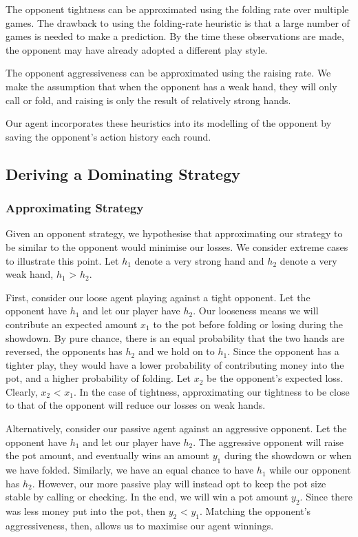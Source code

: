 \documentclass{article}
\begin{document}
The opponent tightness can be approximated using the folding rate over multiple games. The drawback to using the folding-rate heuristic is that a large number of games is needed to make a prediction. By the time these observations are made, the opponent may have already adopted a different play style.

The opponent aggressiveness can be approximated using the raising rate. We make the assumption that when the opponent has a weak hand, they will only call or fold, and raising is only the result of relatively strong hands.

Our agent incorporates these heuristics into its modelling of the opponent by saving the opponent's action history each round.

\subsection{Deriving a Dominating Strategy}

\subsubsection{Approximating Strategy}
Given an opponent strategy, we hypothesise that approximating our strategy to be similar to the opponent would minimise our losses. We consider extreme cases to illustrate this point. Let $h_1$ denote a very strong hand and $h_2$ denote a very weak hand, $h_1$ > $h_2$.

First, consider our loose agent playing against a tight opponent. Let the opponent have $h_1$ and let our player have $h_2$. Our looseness means we will contribute an expected amount $x_1$ to the pot before folding or losing during the showdown. By pure chance, there is an equal probability that the two hands are reversed, the opponents has $h_2$ and we hold on to $h_1$. Since the opponent has a tighter play, they would have a lower probability of contributing money into the pot, and a higher probability of folding. Let $x_2$ be the opponent's expected loss. Clearly, $x_2$ < $x_1$. In the case of tightness, approximating our tightness to be close to that of the opponent will reduce our losses on weak hands.

Alternatively, consider our passive agent against an aggressive opponent.  Let the opponent have $h_1$ and let our player have $h_2$. The aggressive opponent will raise the pot amount, and eventually wins an amount $y_1$ during the showdown or when we have folded. Similarly, we have an equal chance to have $h_1$ while our opponent has $h_2$. However, our more passive play will instead opt to keep the pot size stable by calling or checking. In the end, we will win a pot amount $y_2$. Since there was less money put into the pot, then $y_2$ < $y_1$. Matching the opponent's aggressiveness, then, allows us to maximise our agent winnings.
\end{document}
